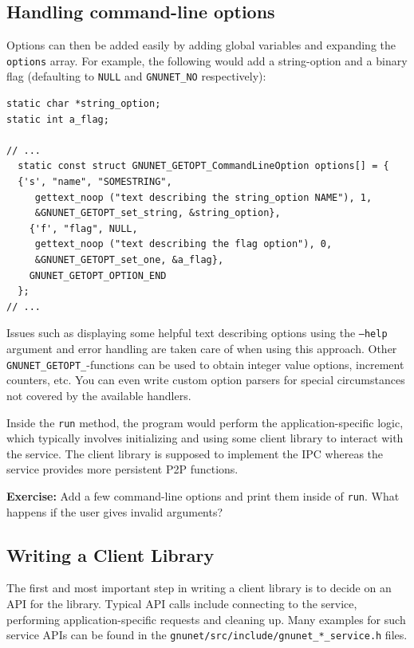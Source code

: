 \documentclass[10pt]{article}
\newcommand{\exercise}[1]{\noindent\begin{boxedminipage}{\textwidth}{\bf Exercise:} #1 \end{boxedminipage}}
\begin{document}
\subsection{Handling command-line options}

Options can then be added easily by adding global variables and
expanding the {\tt options} array.  For example, the following would
add a string-option and a binary flag (defaulting to {\tt NULL} and
{\tt GNUNET\_NO} respectively):

\begin{lstlisting}
static char *string_option;
static int a_flag;

// ...
  static const struct GNUNET_GETOPT_CommandLineOption options[] = {
  {'s', "name", "SOMESTRING",
     gettext_noop ("text describing the string_option NAME"), 1,
     &GNUNET_GETOPT_set_string, &string_option},
    {'f', "flag", NULL,
     gettext_noop ("text describing the flag option"), 0,
     &GNUNET_GETOPT_set_one, &a_flag},
    GNUNET_GETOPT_OPTION_END
  };
// ...
\end{lstlisting}

Issues such as displaying some helpful text describing options using
the {\tt --help} argument and error handling are taken care of when
using this approach.  Other {\tt GNUNET\_GETOPT\_}-functions can be used
to obtain integer value options, increment counters, etc.  You can
even write custom option parsers for special circumstances not covered
by the available handlers.

Inside the {\tt run} method, the program would perform the
application-specific logic, which typically involves initializing and
using some client library to interact with the service.  The client
library is supposed to implement the IPC whereas the service provides
more persistent P2P functions.

\exercise{Add a few command-line options and print them inside
of {\tt run}.  What happens if the user gives invalid arguments?}

\subsection{Writing a Client Library}

The first and most important step in writing a client library is to
decide on an API for the library.  Typical API calls include 
connecting to the service, performing application-specific requests
and cleaning up.  Many examples for such service APIs can be found
in the {\tt gnunet/src/include/gnunet\_*\_service.h} files.
\end{document}
